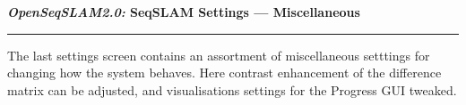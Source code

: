 \centerline{\textbf{\textit{OpenSeqSLAM2.0:} SeqSLAM Settings --- Miscellaneous}}
\noindent\rule{\textwidth}{2pt}
\bigskip
\parbox{\textwidth}{The last settings screen contains an assortment of miscellaneous setttings for changing how the system behaves. Here contrast enhancement of the difference matrix can be adjusted, and visualisations settings for the Progress GUI tweaked.}
\bigskip
